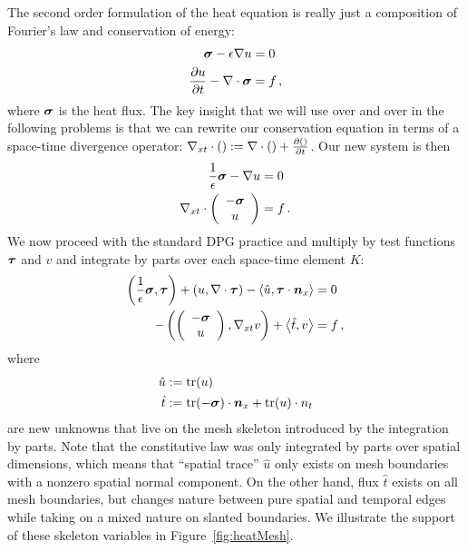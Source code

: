 \documentclass[Proposal.tex]{subfiles}
\begin{document}
The second order formulation of the heat equation is really just a composition of Fourier's law and conservation of energy:
\begin{equation}
\label{eq:heatFirstOrder}
\begin{aligned}
\boldsymbol\sigma-\epsilon\nabla u&=0\\
\frac{\partial u}{\partial t}-\nabla\cdot\boldsymbol\sigma&=f\,,
\end{aligned}
\end{equation}
where $\boldsymbol\sigma$ is the heat flux.
The key insight that we will use over and over in the following problems is that we can rewrite our conservation equation
in terms of a space-time divergence operator: $\nabla_{xt}\cdot():=\nabla\cdot()+\frac{\partial()}{\partial t}$.
Our new system is then
\begin{equation}
\label{eq:heatFirstOrderSpaceTime}
\begin{aligned}
\frac{1}{\epsilon}\boldsymbol\sigma-\nabla u&=0\\
\nabla_{xt}\cdot\left( \begin{array}{c} -\boldsymbol\sigma\\ u\\ \end{array} \right)&=f\,.
\end{aligned}
\end{equation}
We now proceed with the standard DPG practice and multiply by test functions $\boldsymbol\tau$ and $v$ 
and integrate by parts over each space-time element $K$:
\begin{equation}
\label{eq:heatBF}
\begin{aligned}
\left( \frac{1}{\epsilon}\boldsymbol\sigma,\boldsymbol\tau \right)+\left( u,\nabla\cdot\boldsymbol\tau \right)-\left\langle \hat u,\boldsymbol\tau\cdot\boldsymbol n_x \right\rangle&=0\\
-\left( \left( \begin{array}{c} -\boldsymbol\sigma\\ u\\ \end{array} \right),\nabla_{xt} v \right)+\left\langle \hat t,v \right\rangle&=f\,,
\end{aligned}
\end{equation}
where
\begin{align*}
\hat u&:=\operatorname*{tr}(u)\\
\hat t&:=\operatorname*{tr}(-\boldsymbol\sigma)\cdot\boldsymbol n_x+\operatorname*{tr}(u)\cdot n_t
\end{align*}
are new unknowns that live on the mesh skeleton introduced by the integration by parts.
Note that the constitutive law was only integrated by parts over spatial dimensions, which means 
that ``spatial trace'' $\hat u$ only exists on mesh boundaries with a nonzero spatial normal component.
On the other hand, flux $\hat t$ exists on all mesh boundaries, but changes nature between pure spatial and temporal edges while taking on 
a mixed nature on slanted boundaries. We illustrate the support of these skeleton variables in Figure~\ref{fig:heatMesh}.
\end{document}
